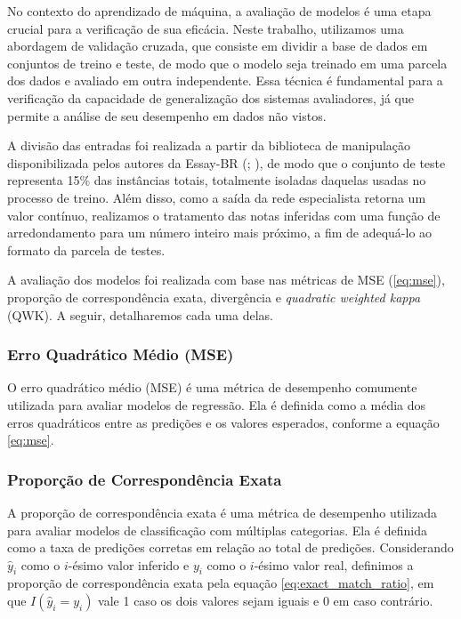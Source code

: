 No contexto do aprendizado de máquina, a avaliação de modelos é uma etapa crucial para a verificação de sua eficácia. Neste trabalho, utilizamos uma abordagem de validação cruzada, que consiste em dividir a base de dados em conjuntos de treino e teste, de modo que o modelo seja treinado em uma parcela dos dados e avaliado em outra independente. Essa técnica é fundamental para a verificação da capacidade de generalização dos sistemas avaliadores, já que permite a análise de seu desempenho em dados não vistos.

A divisão das entradas foi realizada a partir da biblioteca de manipulação disponibilizada pelos autores da Essay-BR (\cite{marinho-et-al-21}; \cite{marinho-et-al-22}), de modo que o conjunto de teste representa 15\% das instâncias totais, totalmente isoladas daquelas usadas no processo de treino. Além disso, como a saída da rede especialista retorna um valor contínuo, realizamos o tratamento das notas inferidas com uma função de arredondamento para um número inteiro mais próximo, a fim de adequá-lo ao formato da parcela de testes.

A avaliação dos modelos foi realizada com base nas métricas de MSE (\autoref{eq:mse}), proporção de correspondência exata, divergência e \textit{quadratic weighted kappa} (QWK). A seguir, detalharemos cada uma delas.

\subsubsection{Erro Quadrático Médio (MSE)}

O erro quadrático médio (MSE) é uma métrica de desempenho comumente utilizada para avaliar modelos de regressão. Ela é definida como a média dos erros quadráticos entre as predições e os valores esperados, conforme a equação \ref{eq:mse}.

\subsubsection{Proporção de Correspondência Exata}

A proporção de correspondência exata é uma métrica de desempenho utilizada para avaliar modelos de classificação com múltiplas categorias. Ela é definida como a taxa de predições corretas em relação ao total de predições. Considerando $\hat{y}_{i}$ como o $i$-ésimo valor inferido e $y_{i}$ como o $i$-ésimo valor real, definimos a proporção de correspondência exata pela equação \ref{eq:exact_match_ratio}, em que $I(\hat{y}_{i} = y_{i})$ vale 1 caso os dois valores sejam iguais e 0 em caso contrário.

